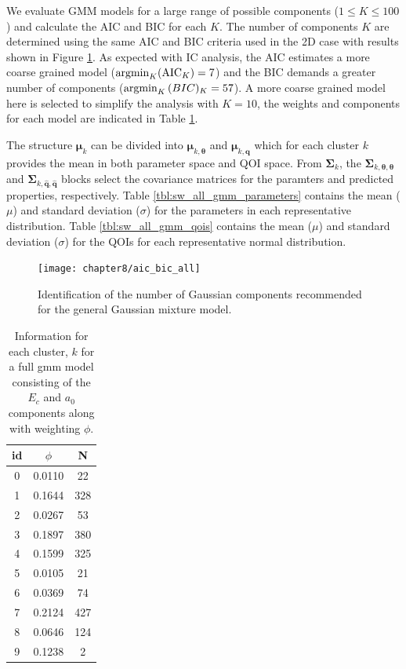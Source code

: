 We evaluate GMM models for a large range of possible components ($1 \leq K \leq 100$) and calculate the AIC and BIC for each $K$.  The number of components $K$ are determined using the same AIC and BIC criteria used in the 2D case with results shown in
Figure \ref{fig:Si_aic_bic_all}.  As expected with IC analysis, the AIC estimates a more coarse grained model ($\operatorname*{argmin}_K(\text{AIC}_K) = 7$) and the BIC demands a greater number of components ($\operatorname*{argmin}_K{\text(BIC)_K} = 57$).
A more coarse grained model here is selected to simplify the analysis with $K=10$, the weights and components for each model are indicated in Table \ref{tbl:sw_all_gmm}.

The structure $\bm{\mu}_k$ can be divided into $\bm{\mu}_{k,\bm{\theta}}$ and $\bm{\mu}_{k,\hat{\bm{q}}}$ which for each cluster $k$ provides the mean in both parameter space and QOI space.
From $\bm{\Sigma}_k$, the $\bm{\Sigma}_{k,\bm{\theta}, \bm{\theta}}$ and $\bm{\Sigma}_{k,\hat{\bm{q}}, \hat{\bm{q}}}$ blocks select the covariance matrices for the paramters and predicted properties, respectively.
Table \ref{tbl:sw_all_gmm_parameters} contains the mean ($\mu$) and standard deviation ($\sigma$) for the parameters in each representative distribution.  Table \ref{tbl:sw_all_gmm_qois} contains the mean ($\mu$) and standard deviation ($\sigma$) for the QOIs for each representative normal distribution.


\begin{figure}[hbt]
	\centering
	\captionsetup{justification=centering,margin=1in}
	\texttt{[image: chapter8/aic\_bic\_all]}
	\caption{Identification of the number of Gaussian components recommended for the general Gaussian mixture model.}
	\label{fig:Si_aic_bic_all}
\end{figure}

\begin{table}[ht]
	\centering
	\caption{Information for each cluster, $k$  for a full gmm model consisting of the $E_c$ and $a_0$ components along with weighting $\phi$.}
	\label{tbl:sw_all_gmm}
	\begin{tabular}{c c c}
    \hline
    id & $\phi$ & N\\
    \hline
    0 & 0.0110 & 22\\
    1 & 0.1644 & 328\\
    2 & 0.0267 & 53\\
    3 & 0.1897 & 380\\
    4 & 0.1599 & 325\\
    5 & 0.0105 & 21 \\
    6 & 0.0369 & 74 \\
    7 & 0.2124 & 427 \\
    8 & 0.0646 & 124 \\
    9 & 0.1238 & 2 \\
    \hline
  \end{tabular}
\end{table}

